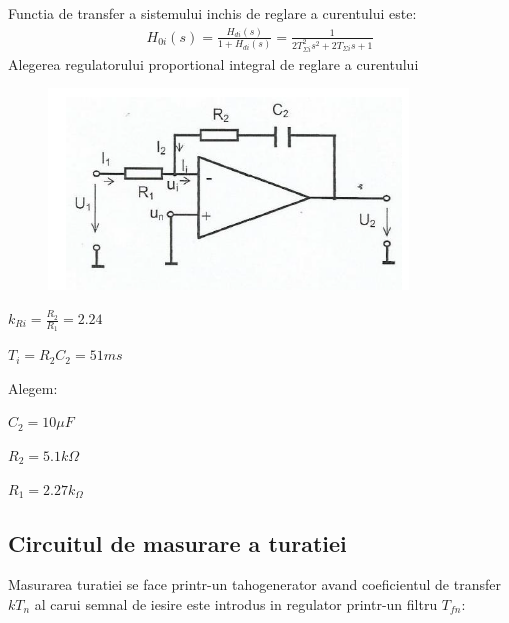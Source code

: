 \documentclass[11pt]{article}
\begin{document}
Functia de transfer a sistemului inchis de reglare a curentului este:
\begin{align*}
H_{0i}(s)=\frac{H_{di}(s)}{1+H_{di}(s)}=\frac{1}{2T_{\Sigma i}^2s^2+2T_{\Sigma i}s+1}
\end{align*}
Alegerea regulatorului proportional integral de reglare a curentului
\begin{figure}[H]
	\centering
	\includegraphics[width=.6\linewidth]{fig16.png}
	\label{fig:test2}
\end{figure}
$k_{Ri}=\frac{R_2}{R_1}=2.24$ 

$T_i=R_2C_2=51ms$

Alegem:

$C_2=10\mu F$

$R_2 = 5.1 k\Omega$

$R_1 = 2.27 k_\Omega$
\subsection{Circuitul de masurare a turatiei}
Masurarea turatiei se face printr-un tahogenerator avand coeficientul de transfer $kT_n$ al carui semnal de iesire este introdus in regulator printr-un filtru $T_{fn}$:

\newpage
\nocite{*}


\end{document}

